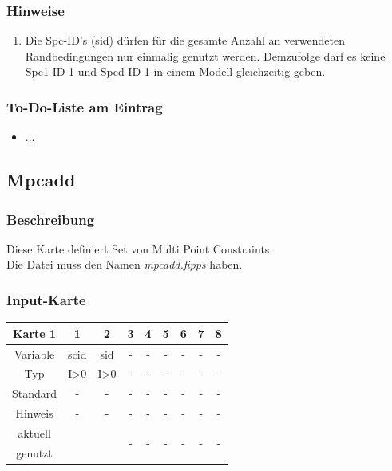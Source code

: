 \documentclass[11pt,titlepage,listof=totoc,bibliography=totoc,twoside]{scrreprt}
\begin{document}
{{\subsubsection{Hinweise}

\begin{enumerate}
\item Die Spc-ID's (sid) dürfen für die gesamte Anzahl an verwendeten Randbedingungen nur einmalig genutzt werden. Demzufolge darf es keine Spc1-ID 1 und Spcd-ID 1 in einem Modell gleichzeitig geben.
\end{enumerate}

\subsubsection{To-Do-Liste am Eintrag}

\begin{itemize}
\item ...
\end{itemize}

\newpage

\subsection{Mpcadd}

\subsubsection{Beschreibung}

Diese Karte definiert Set von Multi Point Constraints.\\
Die Datei muss den Namen \emph{mpcadd.fipps} haben.

\subsubsection{Input-Karte}

\begin{table}[htbp]
\centering
\begin{tabularx}{\textwidth}{cCCCCCCCC}
\toprule
Karte 1	& 1		& 2		& 3		& 4		& 5		& 6		& 7		& 8		\\
\midrule
Variable& scid		& sid		& -		& -		& -		& -		& -		& -		\\
Typ	& I>0		& I>0		& -		& -		& -		& -		& -		& -		\\
Standard& -		& -		& -		& -		& -		& -		& -		& -		\\
Hinweis	& -		& -		& -		& -		& -		& -		& -		& -		\\
aktuell	& 	& 	& 	& 	& 	& \multirow{2}{*}{-}	& 	& 	\\
genutzt \\
\bottomrule
\end{tabularx}
\end{table}

}}
\end{document}
